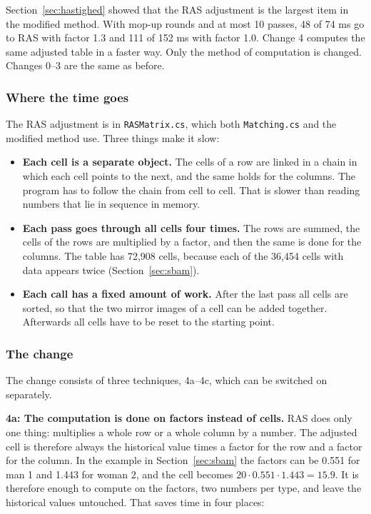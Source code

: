 \documentclass[12pt,a4paper]{article}
\newcommand{\kode}[1]{\texttt{#1}}
\begin{document}
Section~\ref{sec:hastighed} showed that the RAS adjustment is the largest item in the modified
method. With mop-up rounds and at most 10 passes, 48 of 74 ms go to RAS with factor 1.3 and 111 of
152 ms with factor 1.0. Change 4 computes the same adjusted table in a faster way. Only the method
of computation is changed. Changes 0--3 are the same as before.

\subsubsection*{Where the time goes}

The RAS adjustment is in \kode{RASMatrix.cs}, which both \kode{Matching.cs} and the modified method
use. Three things make it slow:

\begin{itemize}
\item \textbf{Each cell is a separate object.} The cells of a row are linked in a chain in which
each cell points to the next, and the same holds for the columns. The program has to follow the
chain from cell to cell. That is slower than reading numbers that lie in sequence in memory.
\item \textbf{Each pass goes through all cells four times.} The rows are summed, the cells of the
rows are multiplied by a factor, and then the same is done for the columns. The table has 72,908
cells, because each of the 36,454 cells with data appears twice (Section~\ref{sec:sbam}).
\item \textbf{Each call has a fixed amount of work.} After the last pass all cells are sorted, so
that the two mirror images of a cell can be added together. Afterwards all cells have to be reset
to the starting point.
\end{itemize}

\subsubsection*{The change}

The change consists of three techniques, 4a--4c, which can be switched on separately.

\textbf{4a: The computation is done on factors instead of cells.} RAS does only one thing:
multiplies a whole row or a whole column by a number. The adjusted cell is therefore always the
historical value times a factor for the row and a factor for the column. In the example in
Section~\ref{sec:sbam} the factors can be 0.551 for man 1 and 1.443 for woman 2, and the cell
becomes $20\cdot 0.551\cdot 1.443=15.9$. It is therefore enough to compute on the factors, two
numbers per type, and leave the historical values untouched. That saves time in four places:
\end{document}
